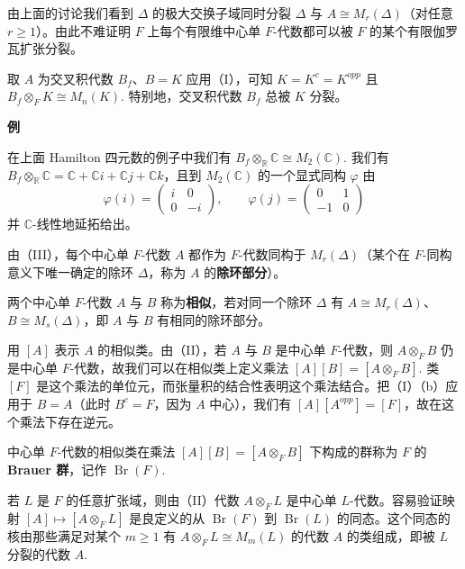 由上面的讨论我们看到 \(\Delta\) 的极大交换子域同时分裂 \(\Delta\) 与 \(A \cong M_r(\Delta)\)（对任意 \(r \geq 1\)）。由此不难证明 \(F\) 上每个有限维中心单 \(F\)-代数都可以被 \(F\) 的某个有限伽罗瓦扩张分裂。

取 \(A\) 为交叉积代数 \(B_f\)、\(B = K\) 应用（I），可知 \(K = K^c = K^{opp}\) 且 \(B_f \otimes_FK \cong M_n(K)\). 特别地，交叉积代数 \(B_f\) 总被 \(K\) 分裂。

\noindent\textbf{例}

在上面 Hamilton 四元数的例子中我们有 \(B_f \otimes_{\mathbb{R}}\mathbb{C} \cong M_2(\mathbb{C})\). 我们有 \(B_f \otimes_{\mathbb{R}}\mathbb{C} = \mathbb{C}+\mathbb{C}i+\mathbb{C}j+\mathbb{C}k\)，且到 \(M_2(\mathbb{C})\) 的一个显式同构 \(\varphi\) 由
\[
\varphi(i) = \begin{pmatrix}i & 0\\ 0 & -i\end{pmatrix}, \qquad \varphi(j) = \begin{pmatrix}0 & 1\\ -1 & 0\end{pmatrix}
\]
并 \(\mathbb{C}\)-线性地延拓给出。

由（III），每个中心单 \(F\)-代数 \(A\) 都作为 \(F\)-代数同构于 \(M_r(\Delta)\)（某个在 \(F\)-同构意义下唯一确定的除环 \(\Delta\)，称为 \(A\) 的\textbf{除环部分}）。

\begin{definition}
两个中心单 \(F\)-代数 \(A\) 与 \(B\) 称为\textbf{相似}，若对同一个除环 \(\Delta\) 有 \(A \cong M_r(\Delta)\)、\(B \cong M_s(\Delta)\)，即 \(A\) 与 \(B\) 有相同的除环部分。
\end{definition}

用 \([A]\) 表示 \(A\) 的相似类。由（II），若 \(A\) 与 \(B\) 是中心单 \(F\)-代数，则 \(A \otimes_FB\) 仍是中心单 \(F\)-代数，故我们可以在相似类上定义乘法 \([A][B] = [A \otimes_FB]\). 类 \([F]\) 是这个乘法的单位元，而张量积的结合性表明这个乘法结合。把（I）（b）应用于 \(B = A\)（此时 \(B^c = F\)，因为 \(A\) 中心），我们有 \([A][A^{opp}] = [F]\)，故在这个乘法下存在逆元。

\begin{definition}
中心单 \(F\)-代数的相似类在乘法 \([A][B] = [A \otimes_FB]\) 下构成的群称为 \(F\) 的 \textbf{Brauer 群}，记作 \(\operatorname{Br}(F)\).
\end{definition}

若 \(L\) 是 \(F\) 的任意扩张域，则由（II）代数 \(A \otimes_FL\) 是中心单 \(L\)-代数。容易验证映射 \([A] \mapsto [A \otimes_FL]\) 是良定义的从 \(\operatorname{Br}(F)\) 到 \(\operatorname{Br}(L)\) 的同态。这个同态的核由那些满足对某个 \(m \geq 1\) 有 \(A \otimes_FL \cong M_m(L)\) 的代数 \(A\) 的类组成，即被 \(L\) 分裂的代数 \(A\).

